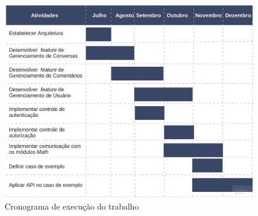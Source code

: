 \begin{figure}[ht!]
\centering
\includegraphics[scale=0.4]{figuras/cronograma.jpg}
\caption{Cronograma de execução do trabalho}
\label{fig:planejamento}
\end{figure}







